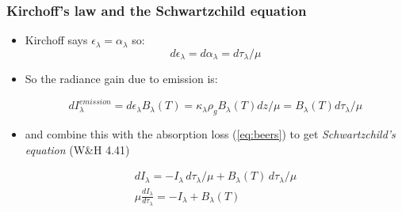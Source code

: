 \documentclass[hyperref={colorlinks=true,linkcolor=blue,urlcolor=blue},numbers]{beamer}
\newcommand{\rad}{%
   \ensuremath{I}
}
\begin{document}
\begin{frame}
  \frametitle{ Kirchoff's law and the Schwartzchild equation}

  \begin{itemize}
  \item Kirchoff says $\epsilon_\lambda = \alpha_\lambda$ so:
    \begin{equation*}
      d\epsilon_\lambda =  d\alpha_\lambda=d\tau_\lambda/\mu
    \end{equation*}

  \item So the radiance gain due to emission is:

    \begin{equation*}
  \label{eq:emission}
  d\rad_\lambda^{emission} = d\epsilon_\lambda B_\lambda (T) = \kappa_\lambda \rho_g  B_\lambda (T) dz/ \mu = B_\lambda(T) d \tau_\lambda /\mu
    \end{equation*}


  \item and combine this with the absorption loss (\ref{eq:beers}) to get \textit{Schwartzchild's equation} (W\&H  4.41)

\begin{gather*}
  \label{eq:schwart2}
   d\rad_\lambda = -\rad_\lambda\, d\tau_\lambda/\mu + B_\lambda (T)\, d\tau_\lambda/\mu \\
  \mu \frac{d\rad_\lambda}{d\tau_\lambda} = -\rad_\lambda + B_\lambda (T)
\end{gather*}


  \end{itemize}

\end{frame}
\end{document}
